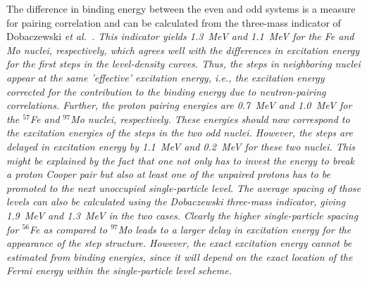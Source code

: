 \begin{multicols}{2}
The difference in binding energy between the even and odd systems is a measure 
for pairing correlation and can be calculated from the three-mass indicator of 
Dobaczewski \sl et al.\ \rm \cite{DM01}. This indicator yields 1.3~MeV and 
1.1~MeV for the Fe and Mo nuclei, respectively, which agrees well with the
differences in excitation energy for the first steps in the level-density 
curves. Thus, the steps in neighboring nuclei appear at the same 'effective' 
excitation energy, i.e., the excitation energy corrected for the contribution 
to the binding energy due to neutron-pairing correlations. Further, the proton 
pairing energies are 0.7~MeV and 1.0~MeV for the $^{57}$Fe and $^{97}$Mo 
nuclei, respectively. These energies should now correspond to the excitation 
energies of the steps in the two odd nuclei. However, the steps are delayed in 
excitation energy by 1.1~MeV and 0.2~MeV for these two nuclei. This might be 
explained by the fact that one not only has to invest the energy to break a 
proton Cooper pair but also at least one of the unpaired protons has to be 
promoted to the next unoccupied single-particle level. The average spacing of 
those levels can also be calculated using the Dobaczewski three-mass indicator,
giving 1.9~MeV and 1.3~MeV in the two cases. Clearly the higher single-particle
spacing for $^{56}$Fe as compared to $^{97}$Mo leads to a larger delay in 
excitation energy for the appearance of the step structure. However, the exact 
excitation energy cannot be estimated from binding energies, since it will 
depend on the exact location of the Fermi energy within the single-particle 
level scheme.


\end{multicols}
